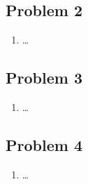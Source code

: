 \documentclass[a4paper,10pt]{article}
\begin{document}

\subsection*{Problem 2}
 
\begin{enumerate}[label= (\alph*)]

 \item \ldots

\end{enumerate}

\subsection*{Problem 3}
\begin{enumerate}[label= (\alph*)]

 \item \ldots

\end{enumerate}

\subsection*{Problem 4}
 
\begin{enumerate}[label= (\alph*)]

 \item \ldots

\end{enumerate}

\end{document}
